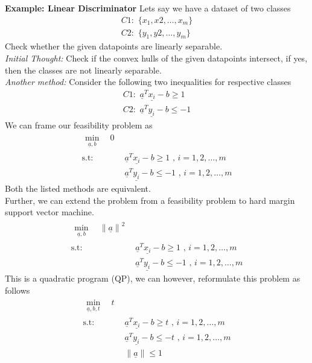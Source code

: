 \documentclass{tufte-handout}
\theoremstyle{remark}
\renewcommand{\vec}[1]{\underline{#1}}
\newcommand\norm[1]{\ensuremath{\lVert#1\rVert}}
\newcommand\twospace{\,\,}
\begin{document}
\textbf{Example: Linear Discriminator}
Lets say we have a dataset of two classes
\begin{align}
    C1:\twospace \{x_1,x2,\dots,x_m\}\nonumber\\
    C2:\twospace \{y_1,y2,\dots,y_m\}\nonumber
\end{align}
Check whether the given datapoints are linearly separable.\\
\textit{Initial Thought:} Check if the convex hulls of the given datapoints intersect, if yes, then the classes are not linearly separable.\\
\textit{Another method:} Consider the following two inequalities for respective classes
\begin{align}
    C1:\twospace \vec{a}^T\vec{x_i}-b\geq 1 \\
    C2:\twospace \vec{a}^T\vec{y_i}-b\leq -1 \nonumber
\end{align}
We can frame our feasibility problem as
\begin{align}
    \begin{split}
        \min_{\vec{a},b}\, &\twospace 0
    \end{split}\\ 
    \text{s.t:}
    \twospace & \vec{a}^T\vec{x_i}-b\geq1 \twospace ,\, i= 1,2,\dots,m\\
    & \vec{a}^T\vec{y_i}-b\leq-1 \twospace ,\, i= 1,2,\dots,m \nonumber
\end{align}
Both the listed methods are equivalent.\\
Further, we can extend the problem from a feasibility problem to hard margin support vector machine.
\begin{align}
    \begin{split}
        \min_{\vec{a},b}\, &\twospace\norm{\vec{a}}^2
    \end{split}\\ 
    \text{s.t:}
    \twospace & \vec{a}^T\vec{x_i}-b \geq 1 \twospace ,\, i= 1,2,\dots,m\\
    & \vec{a}^T\vec{y_i}-b \leq -1 \twospace ,\, i= 1,2,\dots,m \nonumber
\end{align}
This is a quadratic program (QP), we can however, reformulate this problem as follows
\begin{align}
    \begin{split}
        \min_{\vec{a},b,t}\, &\twospace t
    \end{split}\\ 
    \text{s.t:}
    \twospace & \vec{a}^T\vec{x_i}-b \geq t \twospace ,\, i= 1,2,\dots,m\\
    & \vec{a}^T\vec{y_i}-b \leq -t \twospace ,\, i= 1,2,\dots,m \nonumber\\
    & \norm{\vec{a}}\leq 1 \nonumber
\end{align}
\end{document}
